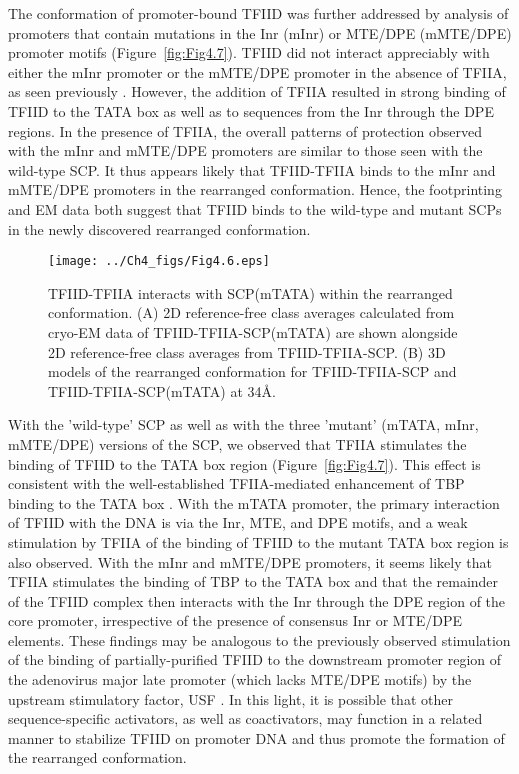 \indent The conformation of promoter-bound TFIID was further addressed by analysis of promoters that contain mutations in the Inr (mInr) or MTE/DPE (mMTE/DPE) promoter motifs (Figure~\ref{fig:Fig4.7}). TFIID did not interact appreciably with either the mInr promoter or the mMTE/DPE promoter in the absence of TFIIA, as seen previously \cite{Juven-Gershon_1249}. However, the addition of TFIIA resulted in strong binding of TFIID to the TATA box as well as to sequences from the Inr through the DPE regions. In the presence of TFIIA, the overall patterns of protection observed with the mInr and mMTE/DPE promoters are similar to those seen with the wild-type SCP. It thus appears likely that TFIID-TFIIA binds to the mInr and mMTE/DPE promoters in the rearranged conformation.  Hence, the footprinting and EM data both suggest that TFIID binds to the wild-type and mutant SCPs in the newly discovered rearranged conformation.\\
\begin{figure}
\centering
\texttt{[image: ../Ch4\_figs/Fig4.6.eps]}
\caption[TFIID-TFIIA interacts with SCP(mTATA) within the rearranged conformation]{TFIID-TFIIA interacts with SCP(mTATA) within the rearranged conformation.  (A) 2D reference-free class averages calculated from cryo-EM data of TFIID-TFIIA-SCP(mTATA) are shown alongside 2D reference-free class averages from TFIID-TFIIA-SCP. (B) 3D models of the rearranged conformation for TFIID-TFIIA-SCP and TFIID-TFIIA-SCP(mTATA) at 34\AA. }
\label{fig:Fig4.6}
\end{figure}
\indent With the 'wild-type' SCP as well as with the three 'mutant' (mTATA, mInr, mMTE/DPE) versions of the SCP, we observed that TFIIA stimulates the binding of TFIID to the TATA box region (Figure~\ref{fig:Fig4.7}). This effect is consistent with the well-established TFIIA-mediated enhancement of TBP binding to the TATA box \cite{Thomas_1201}. With the mTATA promoter, the primary interaction of TFIID with the DNA is via the Inr, MTE, and DPE motifs, and a weak stimulation by TFIIA of the binding of TFIID to the mutant TATA box region is also observed. With the mInr and mMTE/DPE promoters, it seems likely that TFIIA stimulates the binding of TBP to the TATA box and that the remainder of the TFIID complex then interacts with the Inr through the DPE region of the core promoter, irrespective of the presence of consensus Inr or MTE/DPE elements. These findings may be analogous to the previously observed stimulation of the binding of partially-purified TFIID to the downstream promoter region of the adenovirus major late promoter (which lacks MTE/DPE motifs) by the upstream stimulatory factor, USF \cite{Sawadogo_3840,Va_3783}. In this light, it is possible that other sequence-specific activators, as well as coactivators, may function in a related manner to stabilize TFIID on promoter DNA and thus promote the formation of the rearranged conformation. 


